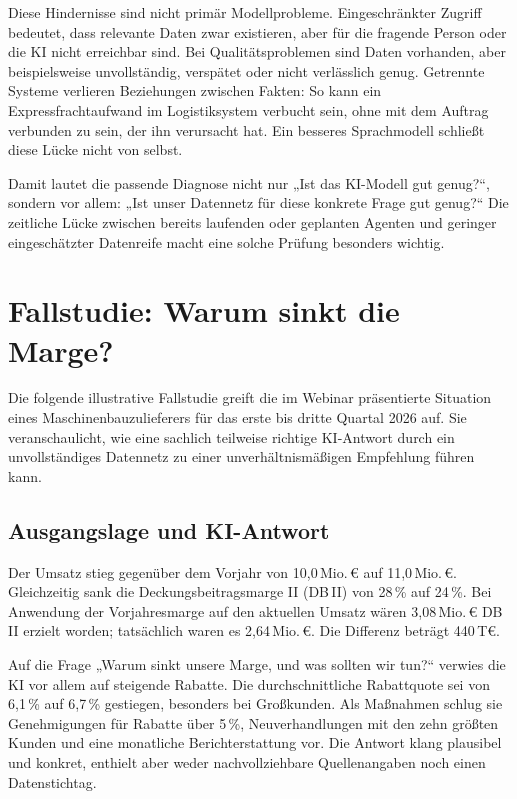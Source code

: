 \documentclass[a4paper,12pt]{article}
\theoremstyle{definition}
\begin{document}
Diese Hindernisse sind nicht primär Modellprobleme. Eingeschränkter Zugriff bedeutet, dass relevante Daten zwar existieren, aber für die fragende Person oder die KI nicht erreichbar sind. Bei Qualitätsproblemen sind Daten vorhanden, aber beispielsweise unvollständig, verspätet oder nicht verlässlich genug. Getrennte Systeme verlieren Beziehungen zwischen Fakten: So kann ein Expressfrachtaufwand im Logistiksystem verbucht sein, ohne mit dem Auftrag verbunden zu sein, der ihn verursacht hat. Ein besseres Sprachmodell schließt diese Lücke nicht von selbst.

Damit lautet die passende Diagnose nicht nur „Ist das KI-Modell gut genug?“, sondern vor allem: „Ist unser Datennetz für diese konkrete Frage gut genug?“ Die zeitliche Lücke zwischen bereits laufenden oder geplanten Agenten und geringer eingeschätzter Datenreife macht eine solche Prüfung besonders wichtig.

\section{Fallstudie: Warum sinkt die Marge?}
\label{sec:case-study}

Die folgende illustrative Fallstudie greift die im Webinar präsentierte Situation eines Maschinenbauzulieferers für das erste bis dritte Quartal 2026 auf. Sie veranschaulicht, wie eine sachlich teilweise richtige KI-Antwort durch ein unvollständiges Datennetz zu einer unverhältnismäßigen Empfehlung führen kann.

\subsection{Ausgangslage und KI-Antwort}
Der Umsatz stieg gegenüber dem Vorjahr von 10{,}0\,Mio.\,€ auf 11{,}0\,Mio.\,€. Gleichzeitig sank die Deckungsbeitragsmarge II (DB\,II) von 28\,\% auf 24\,\%. Bei Anwendung der Vorjahresmarge auf den aktuellen Umsatz wären 3{,}08\,Mio.\,€ DB\,II erzielt worden; tatsächlich waren es 2{,}64\,Mio.\,€. Die Differenz beträgt 440\,T€.

Auf die Frage „Warum sinkt unsere Marge, und was sollten wir tun?“ verwies die KI vor allem auf steigende Rabatte. Die durchschnittliche Rabattquote sei von 6{,}1\,\% auf 6{,}7\,\% gestiegen, besonders bei Großkunden. Als Maßnahmen schlug sie Genehmigungen für Rabatte über 5\,\%, Neuverhandlungen mit den zehn größten Kunden und eine monatliche Berichterstattung vor. Die Antwort klang plausibel und konkret, enthielt aber weder nachvollziehbare Quellenangaben noch einen Datenstichtag.
\end{document}

